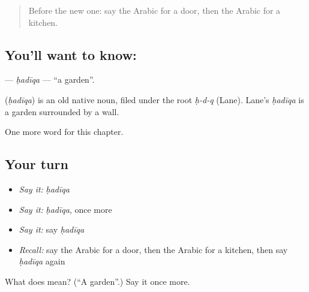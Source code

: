 \label{lesson:AR-C72-hadiqa}



\begin{quote}
Before the new one: say the Arabic for a door, then the Arabic for a kitchen.
\end{quote}

\subsection*{You'll want to know: }
\textbf{} — \emph{ḥadīqa} — \textquotedblleft{}a garden\textquotedblright{}.

\begin{cousinweb}
\textbf{} (\emph{ḥadīqa}) is an old native noun, filed under the root \emph{ḥ-d-q} (Lane). Lane's \emph{ḥadīqa} is a garden surrounded by a wall.
\end{cousinweb}

\begin{grammarlens}[title={What you've built}]
One more word for this chapter.
\end{grammarlens}

\subsection*{Your turn}
\begin{itemize}
\raggedright
  \item \emph{Say it:} \emph{ḥadīqa}
  \item \emph{Say it:} \emph{ḥadīqa}, once more
  \item \emph{Say it:} say \emph{ḥadīqa}
  \item \emph{Recall:} say the Arabic for a door, then the Arabic for a kitchen, then say \emph{ḥadīqa} again
\end{itemize}

\begin{tcolorbox}[breakable,colback=teal!4,colframe=teal!35!black,title={Before you move on}]
What does  mean? (\textquotedblleft{}A garden\textquotedblright{}.) Say it once more.
\end{tcolorbox}

